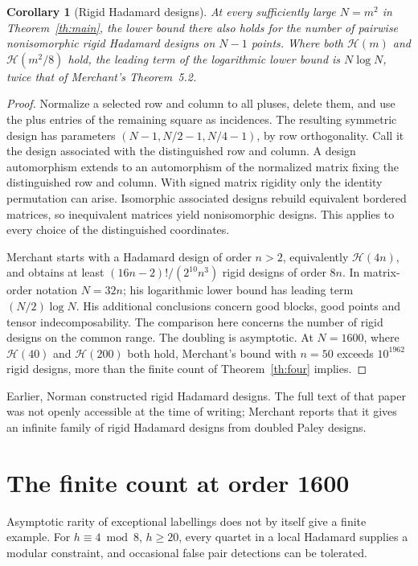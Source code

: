 \documentclass[11pt,reqno]{amsart}
\newtheorem{corollary}[theorem]{Corollary}
\theoremstyle{remark}\newtheorem{remark}[theorem]{Remark}
\newcommand{\HH}{\mathcal H}
\begin{document}
\begin{corollary}[Rigid Hadamard designs]\label{cor:designs}
At every sufficiently large \(N=m^2\) in Theorem~\ref{th:main}, the lower bound there also holds for the number of pairwise nonisomorphic rigid Hadamard designs on \(N-1\) points. Where both \(\HH(m)\) and \(\HH(m^2/8)\) hold, the leading term of the logarithmic lower bound is \(N\log N\), twice that of Merchant's Theorem~5.2.
\end{corollary}
\begin{proof}
Normalize a selected row and column to all pluses, delete them, and use the plus entries of the remaining square as incidences. The resulting symmetric design has parameters \((N-1,N/2-1,N/4-1)\), by row orthogonality. Call it the design associated with the distinguished row and column. A design automorphism extends to an automorphism of the normalized matrix fixing the distinguished row and column. With signed matrix rigidity only the identity permutation can arise. Isomorphic associated designs rebuild equivalent bordered matrices, so inequivalent matrices yield nonisomorphic designs. This applies to every choice of the distinguished coordinates.

Merchant \cite[Theorem~5.2]{merchant} starts with a Hadamard design of order \(n>2\), equivalently \(\HH(4n)\), and obtains at least \((16n-2)!/(2^{10}n^3)\) rigid designs of order \(8n\). In matrix-order notation \(N=32n\); his logarithmic lower bound has leading term \((N/2)\log N\). His additional conclusions concern good blocks, good points and tensor indecomposability. The comparison here concerns the number of rigid designs on the common range. The doubling is asymptotic. At \(N=1600\), where \(\HH(40)\) and \(\HH(200)\) both hold, Merchant's bound with \(n=50\) exceeds \(10^{1962}\) rigid designs, more than the finite count of Theorem~\ref{th:four} implies. \end{proof}
Earlier, Norman \cite{norman73} constructed rigid Hadamard designs. The full text of that paper was not openly accessible at the time of writing; Merchant reports that it gives an infinite family of rigid Hadamard designs from doubled Paley designs.

\section{The finite count at order 1600}\label{sec:finite}
Asymptotic rarity of exceptional labellings does not by itself give a finite example. For \(h\equiv4\bmod8\), \(h\ge20\), every quartet in a local Hadamard supplies a modular constraint, and occasional false pair detections can be tolerated.
\end{document}
